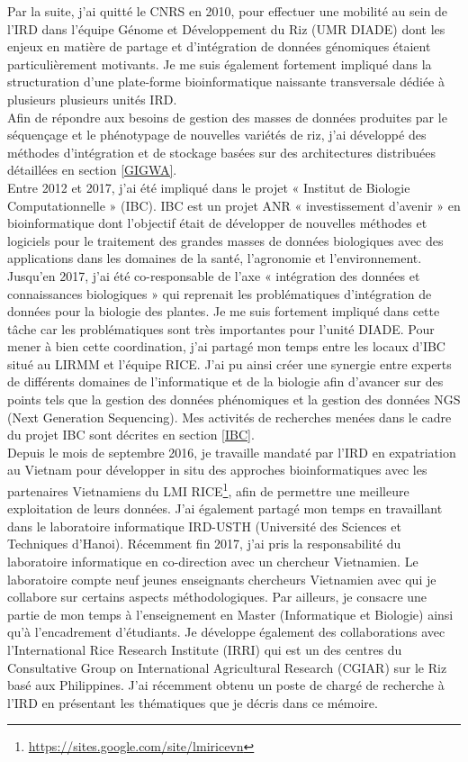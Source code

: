 Par la suite, j’ai quitté le CNRS en 2010, pour effectuer une mobilité au sein de l’IRD dans l’équipe Génome et Développement du Riz (UMR DIADE) dont les enjeux en matière de partage et d’intégration de données génomiques étaient particulièrement motivants. Je me suis également fortement impliqué dans la structuration d’une plate-forme bioinformatique naissante transversale dédiée à plusieurs plusieurs unités IRD. \\
Afin de répondre aux besoins de gestion des masses de données produites par le séquençage et le phénotypage de nouvelles variétés de riz, j’ai développé des méthodes d’intégration et de stockage basées sur des architectures distribuées détaillées en section \ref{GIGWA}. \\
Entre 2012 et 2017, j'ai été impliqué dans le projet « Institut de Biologie Computationnelle » (IBC). IBC est un projet ANR « investissement d’avenir » en bioinformatique dont l’objectif était de développer de nouvelles méthodes et logiciels pour le traitement des grandes masses de données biologiques avec des applications dans les domaines de la santé, l’agronomie et l’environnement. 
Jusqu'en 2017, j'ai été co-responsable de l’axe « intégration des données et connaissances biologiques » qui reprenait les problématiques d’intégration de données pour la biologie des plantes. Je me suis fortement impliqué dans cette tâche car les problématiques sont très importantes pour l’unité DIADE. Pour mener à bien cette coordination, j’ai partagé mon temps entre les locaux d’IBC situé au LIRMM et l’équipe RICE. J’ai pu ainsi créer une synergie entre experts de différents domaines de l’informatique et de la biologie afin d’avancer sur des points tels que la gestion des données phénomiques et la gestion des données NGS (Next Generation Sequencing). Mes activités de recherches menées dans le cadre du projet IBC sont décrites en section \ref{IBC}. \\
Depuis le mois de septembre 2016, je travaille mandaté par l'IRD en expatriation au Vietnam pour développer in situ des approches bioinformatiques avec les partenaires Vietnamiens du LMI RICE\footnote{\url{https://sites.google.com/site/lmiricevn}}, afin de permettre une meilleure exploitation de leurs données. J'ai également partagé mon temps en travaillant dans le laboratoire informatique IRD-USTH (Université des Sciences et Techniques d’Hanoi). Récemment fin 2017, j’ai pris la responsabilité du laboratoire informatique en co-direction avec un chercheur Vietnamien. Le laboratoire compte neuf jeunes enseignants chercheurs Vietnamien avec qui je collabore sur certains aspects méthodologiques. Par ailleurs, je consacre une partie de mon temps à l’enseignement en Master (Informatique et Biologie) ainsi qu’à l’encadrement d’étudiants. Je développe également des collaborations avec l’International Rice Research Institute (IRRI) qui est un des centres du Consultative Group on International Agricultural Research (CGIAR) sur le Riz basé aux Philippines.
J'ai récemment obtenu un poste de chargé de recherche à l'IRD en présentant les thématiques que je décris dans ce mémoire. \\




